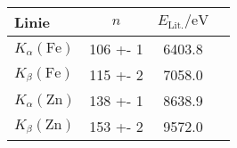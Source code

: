 \begin{tabular}{lSSS}
\toprule

{Linie} & {$n$} & {$E_\mathrm{Lit.} / \si{\electronvolt}$ \cite{booklet}}\\

\midrule

$K_\alpha(\mathrm{Fe})$ & 106 +- 1 & 6403.8 \\
$K_\beta(\mathrm{Fe})$ & 115 +- 2 & 7058.0 \\
$K_\alpha(\mathrm{Zn})$ & 138 +- 1 & 8638.9 \\
$K_\beta(\mathrm{Zn})$ & 153 +- 2 & 9572.0 \\

\bottomrule
\end{tabular}